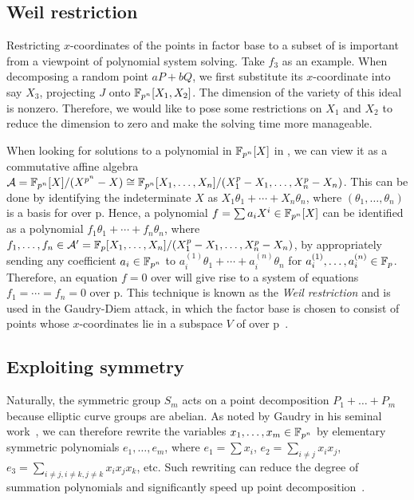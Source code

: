 \subsection{Weil restriction}
%
Restricting $x$-coordinates of the points in factor base to a subset
of  is important from a viewpoint of polynomial system solving.
%
Take $f_3$ as an example.
%
When decomposing a random point $aP+bQ$, we first substitute its
$x$-coordinate into say $X_3$, projecting $J$ onto $\mathbb F_{p^n}[X_1,X_2]$.
%
The dimension of the variety of this ideal is nonzero.
%
Therefore, we would like to pose some restrictions on $X_1$ and $X_2$
to reduce the dimension to zero and make the solving time more
manageable.

When looking for solutions to a polynomial in $\mathbb F_{p^n}[X]$ in ,
we can view it as a commutative affine algebra
$\mathcal A=\mathbb F_{p^n}[X]/(X^{p^n} -
X)\cong\mathbb F_{p^n}[X_1,\ldots,X_n]/(X_1^p - X_1,\ldots,X_n^p - X_n)$.
%
This can be done by identifying the indeterminate $X$ as
$X_1\theta_1+\cdots+X_n\theta_n$, where $(\theta_1,\ldots,\theta_n)$
is a basis for  over \F p.
%
Hence, a polynomial $f=\sum a_iX^i\in\mathbb F_{p^n}[X]$ can be identified as
a polynomial $f_1\theta_1+\cdots+f_n\theta_n$, where
$f_1,\ldots,f_n\in\mathcal A'=\mathbb F_{p}[X_1,\ldots,X_n]/(X_1^p -
X_1,\ldots,X_n^p - X_n)$, by appropriately sending any coefficient
$a_i\in\mathbb F_{p^n}$ to $a_i^{(1)}\theta_1+\cdots+a_i^{(n)}\theta_n$ for
$a_i^{(1)},\ldots,a_i^{(n)}\in\mathbb F_{p}$.
%
Therefore, an equation $f=0$ over  will give rise to a system
of equations $f_1=\cdots=f_n=0$ over \F p.
%
This technique is known as the \emph{Weil restriction} and is used in
the Gaudry-Diem attack, in which the factor base is chosen to consist
of points whose $x$-coordinates lie in a subspace $V$ of  over
\F p~\cite{DBLP:journals/jsc/Gaudry09,DBLP:journals/moc/Diem11}.

\subsection{Exploiting symmetry}
%
\label{sec:exploit-symmetry}
%
Naturally, the symmetric group $S_m$ acts on a point decomposition
$P_1+\ldots+P_m$ because elliptic curve groups are abelian.
%
As noted by Gaudry in his seminal
work~\cite{DBLP:journals/jsc/Gaudry09}, we can therefore rewrite the
variables $x_1,\ldots,x_m\in\mathbb F_{p^n}$ by elementary symmetric
polynomials $e_1,\ldots,e_m$, where $e_1=\sum x_i$,
$e_2=\sum_{i\neq j}x_ix_j$,
$e_3=\sum_{i\neq j,i\neq k,j\neq k}x_ix_jx_k$, etc.
%
Such rewriting can reduce the degree of summation polynomials and
significantly speed up point
decomposition~\cite{DBLP:conf/eurocrypt/FaugerePPR12,DBLP:conf/iwsec/HuangPST13}.

